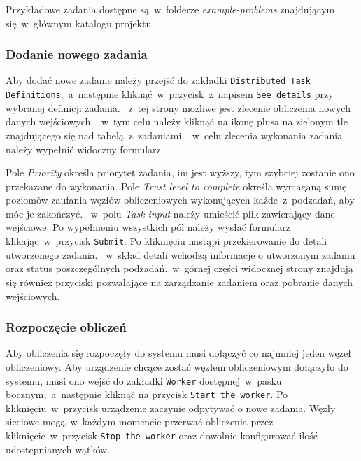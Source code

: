 \documentclass[a4paper,11pt,twoside]{report}
\theoremstyle{definition}
\begin{document}
        Przykładowe zadania dostępne są~w~folderze \textit{example-problems} znajdującym się~w~głównym katalogu projektu.
        
        
        \subsubsection{Dodanie nowego zadania}
        \label{distributed-task-add-guide}
        
        Aby dodać nowe zadanie należy przejść do zakładki \texttt{Distributed Task Definitions},~a~następnie kliknąć~w~przycisk~z~napisem \texttt{See details} przy wybranej definicji zadania.
       ~z~tej strony możliwe jest zlecenie obliczenia nowych danych wejściowych.
       ~w~tym celu należy kliknąć na ikonę plusa na zielonym tle znajdującego się nad tabelą~z~zadaniami.
       ~w~celu zlecenia wykonania zadania należy wypełnić widoczny formularz.
        
        Pole \textit{Priority} określa priorytet zadania, im jest wyższy, tym szybciej zostanie ono przekazane do wykonania.
        Pole \textit{Trust level to complete} określa wymaganą sumę poziomów zaufania węzłów obliczeniowych wykonujących każde~z~podzadań, aby móc je zakończyć. 
       ~w~polu \textit{Task input} należy umieścić plik zawierający dane wejściowe.
        Po wypełnieniu wszystkich pól należy wysłać formularz klikając~w~przycisk \texttt{Submit}. Po kliknięciu nastąpi przekierowanie do detali utworzonego zadania. 
       ~w~skład detali wchodzą informacje o utworzonym zadaniu oraz status poszczególnych podzadań.~w~górnej części widocznej strony znajdują się również przyciski pozwalające na zarządzanie zadaniem oraz pobranie danych wejściowych.
        
        \subsubsection{Rozpoczęcie obliczeń}
        
        Aby obliczenia się rozpoczęły do systemu musi dołączyć co najmniej jeden węzeł obliczeniowy. Aby urządzenie chcące zostać węzłem obliczeniowym dołączyło do systemu, musi ono wejść do zakładki \texttt{Worker} dostępnej~w~pasku bocznym,~a~następnie kliknąć na przycisk \texttt{Start the worker}.
        Po kliknięciu~w~przycisk urządzenie zaczynie odpytywać o nowe zadania.
        Węzły sieciowe mogą~w~każdym momencie przerwać obliczenia przez kliknięcie~w~przycisk \texttt{Stop the worker} oraz dowolnie konfigurować ilość udostępnianych wątków. 
        
\end{document}
